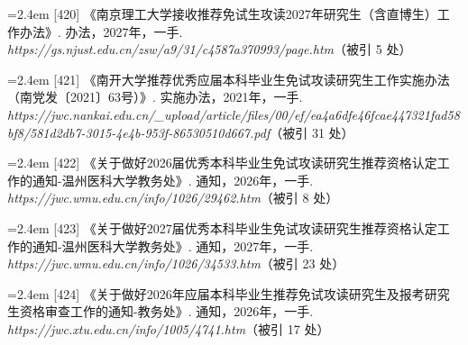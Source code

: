 {\vspace{0.6pt}
\vspace{3.5pt}\par
\nopagebreak\vspace{1pt}
\noindent\hangindent=2.4em \label{src:S0560}{\color{cAccent}[420]} 《南京理工大学接收推荐免试生攻读2027年研究生（含直博生）工作办法》. 办法，2027年，一手. \textit{https://gs.njust.edu.cn/zsw/a9/31/c4587a370993/page.htm}（被引 5 处）\par
\vspace{0.6pt}
\vspace{3.5pt}\par
\nopagebreak\vspace{1pt}
\noindent\hangindent=2.4em \label{src:S0561}{\color{cAccent}[421]} 《南开大学推荐优秀应届本科毕业生免试攻读研究生工作实施办法（南党发〔2021〕63号）》. 实施办法，2021年，一手. \textit{https://jwc.nankai.edu.cn/\_upload/article/files/00/ef/ea4a6dfe46fcae447321fad58bf8/581d2db7-3015-4e4b-953f-86530510d667.pdf}（被引 31 处）\par
\vspace{0.6pt}
\vspace{3.5pt}\par
\nopagebreak\vspace{1pt}
\noindent\hangindent=2.4em \label{src:S0562}{\color{cAccent}[422]} 《关于做好2026届优秀本科毕业生免试攻读研究生推荐资格认定工作的通知-温州医科大学教务处》. 通知，2026年，一手. \textit{https://jwc.wmu.edu.cn/info/1026/29462.htm}（被引 8 处）\par
\vspace{0.6pt}
\noindent\hangindent=2.4em \label{src:S0563}{\color{cAccent}[423]} 《关于做好2027届优秀本科毕业生免试攻读研究生推荐资格认定工作的通知-温州医科大学教务处》. 通知，2027年，一手. \textit{https://jwc.wmu.edu.cn/info/1026/34533.htm}（被引 23 处）\par
\vspace{0.6pt}
\vspace{3.5pt}\par
\nopagebreak\vspace{1pt}
\noindent\hangindent=2.4em \label{src:S0567}{\color{cAccent}[424]} 《关于做好2026年应届本科毕业生推荐免试攻读研究生及报考研究生资格审查工作的通知-教务处》. 通知，2026年，一手. \textit{https://jwc.xtu.edu.cn/info/1005/4741.htm}（被引 17 处）\par
}
